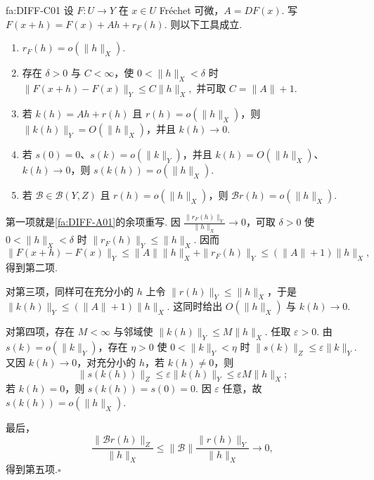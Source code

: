 \begin{FAProposition}{fa:DIFF-C01}
设 \(\displaystyle F:U\to Y\) 在 \(\displaystyle x\in U\) Fréchet 可微，\(\displaystyle A=DF(x)\). 写
\(\displaystyle F(x+h)=F(x)+Ah+r_F(h).\)
则以下工具成立.
\begin{enumerate}
\item \(\displaystyle r_F(h)=o(\|h\|_X)\).
\item 存在 \(\displaystyle\delta>0\) 与 \(\displaystyle C<\infty\)，使 \(\displaystyle0<\|h\|_X<\delta\) 时
\(\displaystyle \|F(x+h)-F(x)\|_Y\leqslant C\|h\|_X,\)
并可取 \(\displaystyle C=\|A\|+1\).
\item 若 \(\displaystyle k(h)=Ah+r(h)\) 且 \(\displaystyle r(h)=o(\|h\|_X)\)，则 \(\displaystyle\|k(h)\|_Y=O(\|h\|_X)\)，并且 \(\displaystyle k(h)\to0\).
\item 若 \(\displaystyle s(0)=0\)、\(\displaystyle s(k)=o(\|k\|_Y)\)，并且 \(\displaystyle k(h)=O(\|h\|_X)\)、\(\displaystyle k(h)\to0\)，则 \(\displaystyle s(k(h))=o(\|h\|_X)\).
\item 若 \(\displaystyle\mathcal B\in\mathcal B(Y,Z)\) 且 \(\displaystyle r(h)=o(\|h\|_X)\)，则 \(\displaystyle\mathcal Br(h)=o(\|h\|_X)\).
\end{enumerate}
\end{FAProposition}

\begin{FAProof}
第一项就是\autoref{fa:DIFF-A01}的余项重写. 因 \(\displaystyle\frac{\|r_F(h)\|_Y}{\|h\|_X}\to0\)，可取 \(\displaystyle\delta>0\) 使 \(\displaystyle0<\|h\|_X<\delta\) 时 \(\displaystyle\|r_F(h)\|_Y\leqslant\|h\|_X\). 因而
\[
\|F(x+h)-F(x)\|_Y
\leqslant
\|A\|\|h\|_X+\|r_F(h)\|_Y
\leqslant
(\|A\|+1)\|h\|_X,
\]
得到第二项.

对第三项，同样可在充分小的 \(\displaystyle h\) 上令 \(\displaystyle\|r(h)\|_Y\leqslant\|h\|_X\)，于是
\(\displaystyle \|k(h)\|_Y \leqslant (\|A\|+1)\|h\|_X.\)
这同时给出 \(\displaystyle O(\|h\|_X)\) 与 \(\displaystyle k(h)\to0\).

对第四项，存在 \(\displaystyle M<\infty\) 与邻域使 \(\displaystyle\|k(h)\|_Y\leqslant M\|h\|_X\). 任取 \(\displaystyle\varepsilon>0\). 由 \(\displaystyle s(k)=o(\|k\|_Y)\)，存在 \(\displaystyle\eta>0\) 使 \(\displaystyle0<\|k\|_Y<\eta\) 时 \(\displaystyle\|s(k)\|_Z\leqslant\varepsilon\|k\|_Y\). 又因 \(\displaystyle k(h)\to0\)，对充分小的 \(\displaystyle h\)，若 \(\displaystyle k(h)\neq0\)，则
\[
\|s(k(h))\|_Z
\leqslant
\varepsilon\|k(h)\|_Y
\leqslant
\varepsilon M\|h\|_X;
\]
若 \(\displaystyle k(h)=0\)，则 \(\displaystyle s(k(h))=s(0)=0\). 因 \(\displaystyle\varepsilon\) 任意，故 \(\displaystyle s(k(h))=o(\|h\|_X)\).

最后，
\[
\frac{\|\mathcal Br(h)\|_Z}{\|h\|_X}
\leqslant
\|\mathcal B\|\frac{\|r(h)\|_Y}{\|h\|_X}
\longrightarrow0,
\]
得到第五项.\hfill\(\square\)
\end{FAProof}

